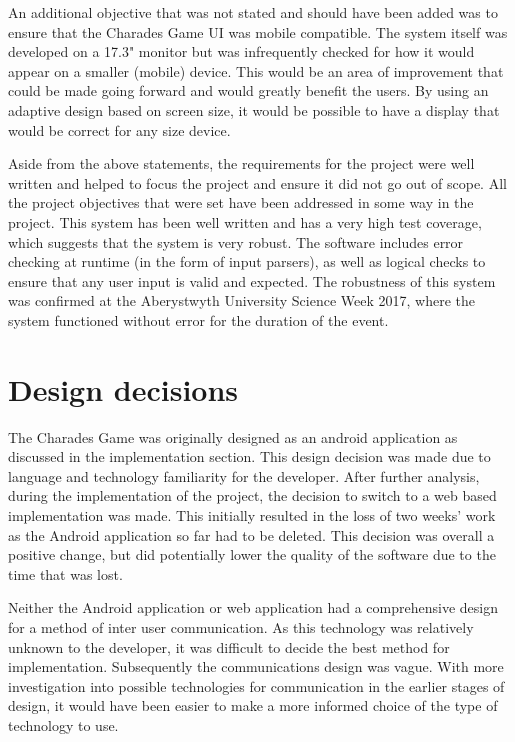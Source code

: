 An additional objective that was not stated and should have been added was to ensure that the Charades Game UI was mobile compatible. The system itself was developed on a 17.3" monitor but was infrequently checked for how it would appear on a smaller (mobile) device. This would be an area of improvement that could be made going forward and would greatly benefit the users. By using an adaptive design based on screen size, it would be possible to have a display that would be correct for any size device.

Aside from the above statements, the requirements for the project were well written and helped to focus the project and ensure it did not go out of scope. All the project objectives that were set have been addressed in some way in the project. This system has been well written and has a very high test coverage, which suggests that the system is very robust. The software includes error checking at runtime (in the form of input parsers), as well as logical checks to ensure that any user input is valid and expected. The robustness of this system was confirmed at the Aberystwyth University Science Week 2017, where the system functioned without error for the duration of the event.


\section{Design decisions}

The Charades Game was originally designed as an android application as discussed in the implementation section. This design decision was made due to language and technology familiarity for the developer. After further analysis, during the implementation of the project, the decision to switch to a web based implementation was made. This initially resulted in the loss of two weeks' work as the Android application so far had to be deleted. This decision was overall a positive change, but did potentially lower the quality of the software due to the time that was lost.

Neither the Android application or web application had a comprehensive design for a method of inter user communication. As this technology was relatively unknown to the developer, it was difficult to decide the best method for implementation. Subsequently the communications design was vague. With more investigation into possible technologies for communication in the earlier stages of design, it would have been easier to make a more informed choice of the type of technology to use.

